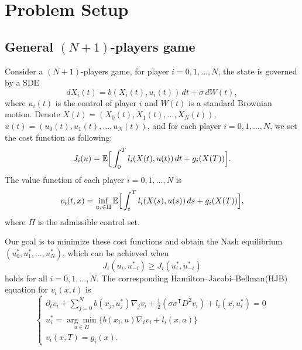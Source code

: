 \documentclass{article}
\begin{document}
 
\section{Problem Setup}

\subsection{General $(N+1)$-players game}

Consider a $(N+1)$-players game, for player $i = 0, 1, \dots, N$, the state is governed by a SDE
\begin{equation} \label{state of N+1 player game}
    d X_{i}(t) = b(X_{i}(t), u_{i}(t)) \, d t + \sigma \, d W(t),
\end{equation}
where $u_{i} (t)$ is the control of player $i$ and $W(t)$ is a standard Brownian motion. Denote $X(t) = (X_{0}(t), X_{1}(t), \dots, X_{N}(t))$,  $u(t) = (u_{0}(t), u_{1}(t), \dots, u_{N}(t))$, and for each player $i = 0, 1, \dots, N$, we set the cost function as following:
\begin{equation} \label{cost function of of N+1 player game}
    J_{i}(u) = \mathbb{E} \Big{[} \int_{0}^{T} l_{i}(X(t), u(t)) \, d t + g_{i}(X(T)) \Big{]}.
\end{equation}
The value function of each player $i = 0, 1, \dots, N$ is
\begin{equation*} \label{value function of N+1 player game}
    v_{i} (t,x) = \inf_{u_{i} \in \Pi} \mathbb{E} \Big{[} \int_{t}^{T} l_{i}(X(s), u(s)) \, d s + g_{i}(X(T)) \Big{]},
\end{equation*}
where $\Pi$ is the admissible control set.

Our goal is to minimize these cost functions and obtain the Nash equilibrium $(u_{0}^{*}, u_{1}^{*}, \dots, u_{N}^{*})$, which can be achieved when 
\begin{equation} \label{eq: Nash equilibrium of N+1 player game}
    J_{i}(u_{i}, u_{-i}^{*}) \geq J_{i}(u_{i}^{*}, u_{-i}^{*})
\end{equation}
holds for all $i = 0, 1, \dots, N$. The corresponding Hamilton–Jacobi–Bellman(HJB) equation for $v_{i}(x, t)$ is
\begin{equation} \label{HJB of N+1 player game}
    \begin{cases}
    \partial_{t} v_{i} + \sum_{j = 0}^{N} b(x_{j}, u_{j}^{*}) \nabla_{j} v_{i} + \frac{1}{2} (\sigma \sigma^\mathsf{T} D^{2} v_{i}) + l_{i}(x, u_{i}^{*}) = 0 \\
    u_{i}^{*} = \underset{u \in \Pi}{\arg\min} \{b(x_{i}, u) \nabla_{i} v_{i} + l_{i}(x, a) \} \\
    v_{i} (x, T) = g_{i} (x).
    \end{cases}
\end{equation}
\end{document}
